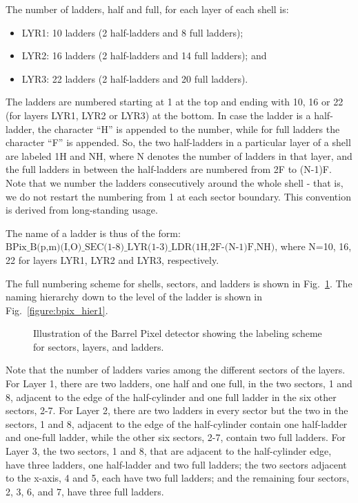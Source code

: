 \documentclass{cmspaper}
\begin{document}
The number of ladders,
half and full, for each layer of each shell is:
\begin{itemize}
\item LYR1: 10 ladders (2 half-ladders and 8 full ladders);
\item LYR2: 16 ladders (2 half-ladders and 14 full ladders); and
\item LYR3: 22 ladders (2 half-ladders and 20 full ladders).
\end{itemize}

The ladders are numbered starting at 1 at the top and ending with 10, 16 or 22 
(for layers LYR1, LYR2 or LYR3) at the bottom.
In case the ladder is a half-ladder, 
the character ``H'' is appended to the number,
while for full ladders the character ``F'' is appended.
So, the two half-ladders in a particular layer of a shell are labeled 1H and NH,
where N denotes the number of ladders in that layer,
and the full ladders in between the half-ladders are numbered from 2F to (N-1)F.
Note that we number the ladders consecutively around the whole shell - that 
is, we do not restart the numbering from 1 at each sector boundary. This 
convention is derived from long-standing usage. 

The name of a ladder is thus of the form:
$\mbox{BPix\_B(p,m)(I,O)\_SEC(1-8)\_LYR(1-3)\_LDR(1H,2F-(N-1)F,NH),}$
where N=10, 16, 22 for layers LYR1, LYR2 and LYR3, respectively. 

The full numbering scheme for shells, sectors, and ladders is shown in
Fig.~\ref{figure:barrel_layout}. The naming hierarchy down to the level of the
ladder is shown in Fig.~\ref{figure:bpix_hier1}.

\begin{figure}
\begin{center}   
\caption{Illustration of the Barrel Pixel detector showing the labeling
scheme for sectors, layers, and ladders.     
\label{figure:barrel_layout} }
\end{center}
\end{figure}

Note that the number of ladders varies among the different sectors of the layers. 
For Layer 1, there are two ladders, one half and one full, 
in the two sectors, 1 and 8, adjacent to the edge of the half-cylinder 
and one full ladder in the six other sectors, 2-7. 
For Layer 2, there are two ladders in every sector but the two in the sectors, 1 and 8,
adjacent to the edge of the half-cylinder contain one half-ladder and one-full ladder, 
while the other six sectors, 2-7, contain two full ladders.
For Layer 3, the two sectors, 1 and 8, that are adjacent to the half-cylinder edge,
have three ladders, one half-ladder and two full ladders; 
the two sectors adjacent to the x-axis, 4 and 5, each have two full ladders; 
and the remaining four sectors, 2, 3, 6, and 7, have three full ladders.
\end{document}
